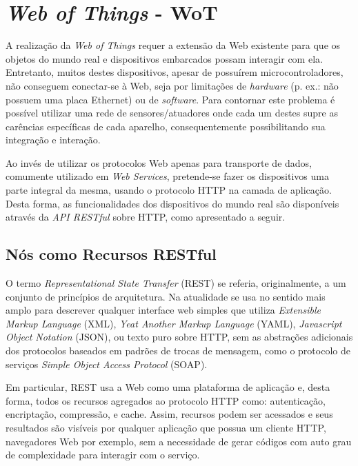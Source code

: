 \documentclass[12pt,a4paper,oneside]{report}
\begin{document}
\section{\emph{Web of Things} - WoT}

A realização da \emph{Web of Things} requer a extensão da Web existente para que os objetos do mundo real e dispositivos embarcados possam interagir com ela. Entretanto, muitos destes dispositivos, apesar de possuírem microcontroladores, não conseguem conectar-se à Web, seja por limitações de \emph{hardware} (p. ex.: não possuem uma placa Ethernet) ou de \emph{software}. Para contornar este problema é possível utilizar uma rede de sensores/atuadores onde cada um destes supre as carências específicas de cada aparelho, consequentemente possibilitando sua integração e interação.

Ao invés de utilizar os protocolos Web apenas para transporte de dados, comumente utilizado em \emph{Web Services}, pretende-se fazer os dispositivos uma parte integral da mesma, usando o protocolo HTTP na camada de aplicação. Desta forma, as funcionalidades dos dispositivos do mundo real são disponíveis através da \emph{API RESTful} \cite{restws} sobre HTTP, como apresentado a seguir.

\subsection{Nós como Recursos RESTful}

O termo \emph{Representational State Transfer} (REST)\cite{w3curi} se referia, originalmente, a um conjunto de princípios de arquitetura. Na atualidade se usa no sentido mais amplo para descrever qualquer interface web simples que utiliza \emph{Extensible Markup Language} (XML)\cite{w3cxml}, \emph{Yeat Another Markup Language} (YAML)\cite{yaml}, \emph{Javascript Object Notation} (JSON)\cite{json}, ou texto puro sobre HTTP, sem as abstrações adicionais dos protocolos baseados em padrões de trocas de mensagem, como o protocolo de serviços \emph{Simple Object Access Protocol} (SOAP)\cite{w3csoap}.

Em particular, REST usa a Web como uma plataforma de aplicação e, desta forma, todos os recursos agregados ao protocolo HTTP como: autenticação, encriptação, compressão, e cache. Assim, recursos podem ser acessados e seus resultados são visíveis por qualquer aplicação que possua um cliente HTTP, navegadores Web por exemplo, sem a necessidade de gerar códigos com auto grau de complexidade para interagir com o serviço.
\end{document}
